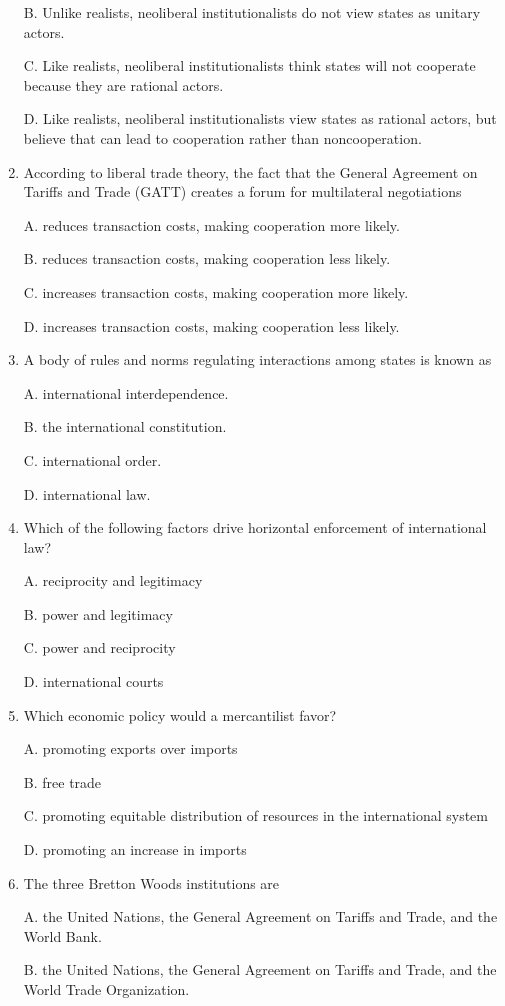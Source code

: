 \documentclass[
]{book}
\begin{document}
\begin{enumerate}
  B. Unlike realists, neoliberal institutionalists do not view states as unitary actors.

  C. Like realists, neoliberal institutionalists think states will not cooperate because they are rational actors.

  D. Like realists, neoliberal institutionalists view states as rational actors, but believe that can lead to cooperation rather than noncooperation.
\item
  According to liberal trade theory, the fact that the General Agreement on Tariffs and Trade (GATT) creates a forum for multilateral negotiations

  A. reduces transaction costs, making cooperation more likely.

  B. reduces transaction costs, making cooperation less likely.

  C. increases transaction costs, making cooperation more likely.

  D. increases transaction costs, making cooperation less likely.
\item
  A body of rules and norms regulating interactions among states is known as

  A. international interdependence.

  B. the international constitution.

  C. international order.

  D. international law.
\item
  Which of the following factors drive horizontal enforcement of international law?

  A. reciprocity and legitimacy

  B. power and legitimacy

  C. power and reciprocity

  D. international courts
\item
  Which economic policy would a mercantilist favor?

  A. promoting exports over imports

  B. free trade

  C. promoting equitable distribution of resources in the international system

  D. promoting an increase in imports
\item
  The three Bretton Woods institutions are

  A. the United Nations, the General Agreement on Tariffs and Trade, and the World Bank.

  B. the United Nations, the General Agreement on Tariffs and Trade, and the World Trade Organization.


\end{enumerate}
\end{document}
